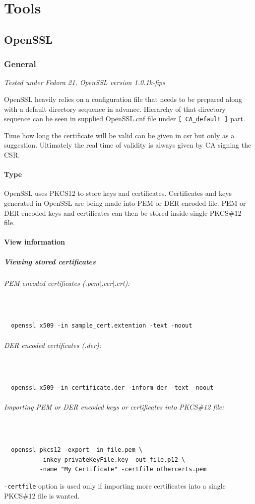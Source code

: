 \documentclass[10pt, a4paper]{report}
\newcommand{\myparagraph}[1]{\paragraph{#1}\mbox{}\\} %
\begin{document}
\newpage
\part{Tools}

\chapter{OpenSSL}

\section{General}
\textit{Tested under Fedora 21, OpenSSL version 1.0.1k-fips} %

OpenSSL heavily relies on a configuration file that needs to be prepared along with a default directory sequence in advance. Hierarchy of that directory sequence can be seen in supplied OpenSSL.cnf file under \verb+[ CA_default ]+ part.

Time how long the certificate will be valid can be given in csr but only as a suggestion. Ultimately the real time of
validity is always given by CA signing the CSR.

  \subsection{Type}
  OpenSSL uses PKCS12 to store keys and certificates. Certificates and keys generated in OpenSSL are being made into PEM or DER encoded file. PEM or DER encoded keys and certificates can then be stored inside single PKCS\#12 file. 
             
  \subsection{View information}
  
\subsubsection{Viewing stored certificates}
\myparagraph{PEM encoded certificates (.pem$\vert$.cer$\vert$.crt):}
  \begin{verbatim}
  openssl x509 -in sample_cert.extention -text -noout
  \end{verbatim}
\myparagraph{DER encoded certificates (.der):}
  \begin{verbatim}
  openssl x509 -in certificate.der -inform der -text -noout
  \end{verbatim}
\myparagraph{Importing PEM or DER encoded keys or certificates into PKCS\#12 file:}
  \begin{verbatim}
  openssl pkcs12 -export -in file.pem \
          -inkey privateKeyFile.key -out file.p12 \
          -name "My Certificate" -certfile othercerts.pem
  \end{verbatim}
\verb+-certfile+ option is used only if importing more certificates into a single PKCS\#12 file is wanted.
\end{document}

